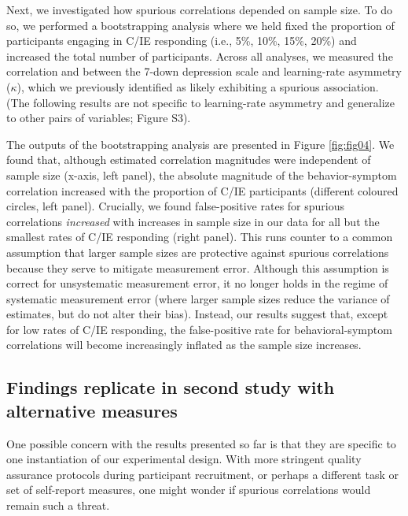 \documentclass[a4paper,notitlepage,12pt]{article}
\begin{document}
Next, we investigated how spurious correlations depended on sample size. To do so, we performed a bootstrapping analysis where we held fixed the proportion of participants engaging in C/IE responding (i.e., 5\%, 10\%, 15\%, 20\%) and increased the total number of participants. Across all analyses, we measured the correlation and between the 7-down depression scale and learning-rate asymmetry ($\kappa$), which we previously identified as likely exhibiting a spurious association. (The following results are not specific to learning-rate asymmetry and generalize to other pairs of variables; Figure S3).  

The outputs of the bootstrapping analysis are presented in Figure \ref{fig:fig04}. We found that, although estimated correlation magnitudes were independent of sample size (x-axis, left panel), the absolute magnitude of the behavior-symptom correlation increased with the proportion of C/IE participants (different coloured circles, left panel). Crucially, we found false-positive rates for spurious correlations \emph{increased} with increases in sample size in our data for all but the smallest rates of C/IE responding (right panel). This runs counter to a common assumption that larger sample sizes are protective against spurious correlations because they serve to mitigate measurement error. Although this assumption is correct for unsystematic measurement error, it no longer holds in the regime of systematic measurement error (where larger sample sizes reduce the variance of estimates, but do not alter their bias). Instead, our results suggest that, except for low rates of C/IE responding, the false-positive rate for behavioral-symptom correlations will become increasingly inflated as the sample size increases.

\subsection*{Findings replicate in second study with alternative measures}

One possible concern with the results presented so far is that they are specific to one instantiation of our experimental design. With more stringent quality assurance protocols during participant recruitment, or perhaps a different task or set of self-report measures, one might wonder if spurious correlations would remain such a threat.
\end{document}
